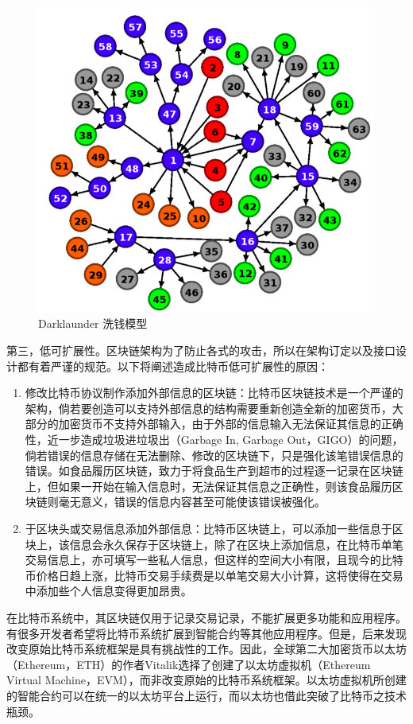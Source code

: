 					\begin{figure}[!htbp]
						\centering
						\includegraphics[width = .6\textwidth]{Darklaunderworkflow.png}
						\caption{Darklaunder 洗钱模型\supercite{AnAnalysisofBitcoinLaundryServices}}\label{Darklaunderworkflow}
					\end{figure}

				第三，低可扩展性。区块链架构为了防止各式的攻击，所以在架构订定以及接口设计都有着严谨的规范。以下将阐述造成比特币低可扩展性的原因：

					\begin{enumerate}

						\item 修改比特币协议制作添加外部信息的区块链：比特币区块链技术是一个严谨的架构，倘若要创造可以支持外部信息的结构需要重新创造全新的加密货币，大部分的加密货币不支持外部输入，由于外部的信息输⼊无法保证其信息的正确性，近一步造成垃圾进垃圾出（Garbage In, Garbage Out，GIGO）的问题，倘若错误的信息存储在无法删除、修改的区块链下，只是强化该笔错误信息的错误。如食品履历区块链，致力于将食品生产到超市的过程逐一记录在区块链上，但如果一开始在输入信息时，无法保证其信息之正确性，则该食品履历区块链则毫无意义，错误的信息内容甚至可能使该错误被强化。

						\item 于区块头或交易信息添加外部信息：比特币区块链上，可以添加一些信息于区块上，该信息会永久保存于区块链上，除了在区块上添加信息，在比特币单笔交易信息上，亦可填写一些私人信息，但这样的空间大小有限，且现今的比特币价格日趋上涨，比特币交易手续费是以单笔交易大小计算，这将使得在交易中添加些个人信息变得更加昂贵。

					\end{enumerate}

				在比特币系统中，其区块链仅用于记录交易记录，不能扩展更多功能和应用程序。有很多开发者希望将比特币系统扩展到智能合约等其他应用程序。但是，后来发现改变原始比特币系统框架是具有挑战性的工作。因此，全球第二大加密货币以太坊（Ethereum，ETH）的作者Vitalik选择了创建了以太坊虚拟机（Ethereum Virtual Machine，EVM），而非改变原始的比特币系统框架。以太坊虚拟机所创建的智能合约可以在统一的以太坊平台上运行，而以太坊也借此突破了比特币之技术瓶颈。
	
